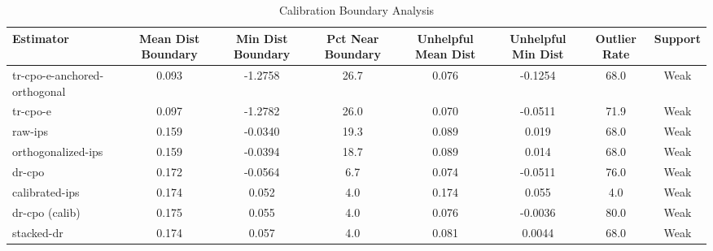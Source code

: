 \begin{table}[htbp]
\centering
\caption{Calibration Boundary Analysis}
\label{tab:A5}
\begin{tabular}{l|ccccccc}
\toprule
Estimator & Mean Dist Boundary & Min Dist Boundary & Pct Near Boundary & Unhelpful Mean Dist & Unhelpful Min Dist & Outlier Rate & Support \\
\midrule
tr-cpo-e-anchored-orthogonal & 0.093 & -1.2758 & 26.7 & 0.076 & -0.1254 & 68.0 & Weak \\
tr-cpo-e & 0.097 & -1.2782 & 26.0 & 0.070 & -0.0511 & 71.9 & Weak \\
raw-ips & 0.159 & -0.0340 & 19.3 & 0.089 & 0.019 & 68.0 & Weak \\
orthogonalized-ips & 0.159 & -0.0394 & 18.7 & 0.089 & 0.014 & 68.0 & Weak \\
dr-cpo & 0.172 & -0.0564 & 6.7 & 0.074 & -0.0511 & 76.0 & Weak \\
calibrated-ips & 0.174 & 0.052 & 4.0 & 0.174 & 0.055 & 4.0 & Weak \\
dr-cpo (calib) & 0.175 & 0.055 & 4.0 & 0.076 & -0.0036 & 80.0 & Weak \\
stacked-dr & 0.174 & 0.057 & 4.0 & 0.081 & 0.0044 & 68.0 & Weak \\
\bottomrule
\end{tabular}
\end{table}